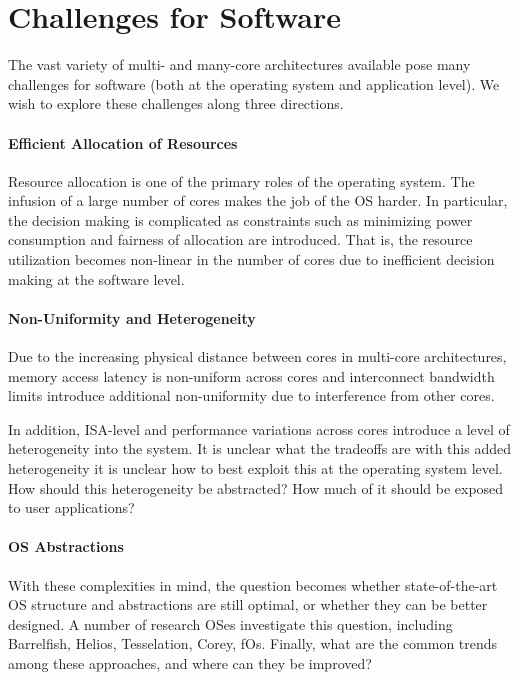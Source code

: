 \section{Challenges for Software}
\label{sec:challenges}

The vast variety of multi- and many-core architectures available pose many challenges for
software (both at the operating system and application level). We wish to explore these
challenges along three directions.

\paragraph{Efficient Allocation of Resources}

Resource allocation is one of the primary roles of the operating system. The infusion of a
large number of cores makes the job of the OS harder. In particular, the decision making
is complicated as constraints such as minimizing power consumption and fairness of allocation
are introduced. That is, the resource utilization becomes non-linear in the number of cores due to
inefficient decision making at the software level.

\paragraph{Non-Uniformity and Heterogeneity}

Due to the increasing physical distance between cores in multi-core architectures, memory
access latency is non-uniform across cores and interconnect bandwidth limits
introduce additional non-uniformity due to interference from other cores.

In addition, ISA-level and performance variations across cores introduce a level of
heterogeneity into the system. It is unclear what the tradeoffs are with this added
heterogeneity it is unclear how to best exploit this at the operating system level. How
should this heterogeneity be abstracted? How much of it should be exposed to user
applications?

\paragraph{OS Abstractions}

With these complexities in mind, the question becomes whether state-of-the-art
OS structure and abstractions are still optimal, or whether they can be better designed.
A number of research OSes investigate this question, including Barrelfish, Helios, Tesselation, Corey, fOs.
Finally, what are the common trends among these approaches, and where can they be improved?

